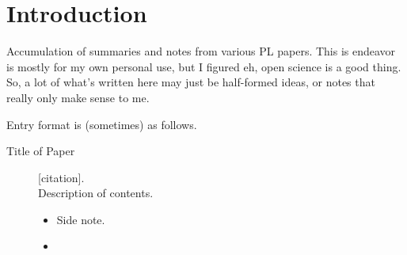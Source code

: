 \chapter {Introduction}

Accumulation of summaries and notes from various PL papers.
This is endeavor is mostly for my own personal use, but I figured eh, open science is a good thing.
So, a lot of what's written here may just be half-formed ideas, or notes that really only make sense to me.

Entry format is (sometimes) as follows.

\begin{description}
  \item[Title of Paper] {[citation].
    \\ Description of contents.
    \begin{itemize}
      \item Side note.
      \item {}
    \end{itemize}}
\end{description}
